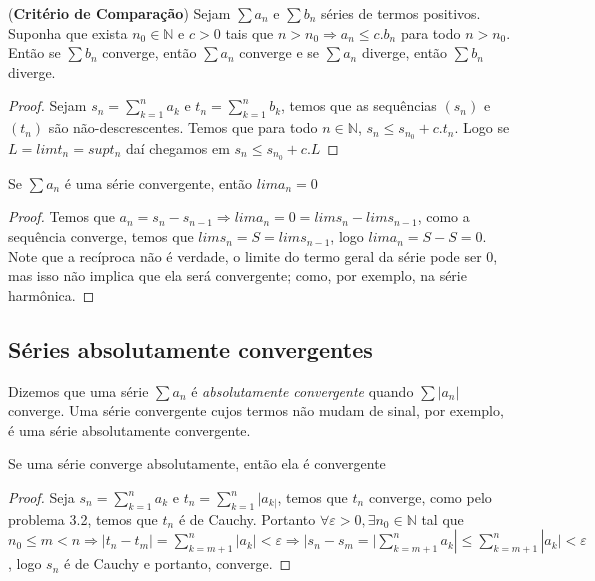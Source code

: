 \begin{theorem}(\textbf{Critério de Comparação})
Sejam $\sum a_{n}$ e $\sum b_{n}$ séries de termos positivos. Suponha que exista $n_{0} \in \mathbb{N}$ e $c>0$ tais que $n>n_{0}\Rightarrow a_{n} \leq c.b_{n}$ para todo $n>n_{0}$. Então se $\sum b_{n}$ converge, então $\sum a_{n}$ converge e se $\sum a_{n}$ diverge, então $\sum b_{n}$ diverge.
\end{theorem}

\begin{proof}
Sejam $s_{n}=\sum_{k=1}^{n}a_{k}$ e $t_{n}=\sum_{k=1}^{n}b_{k}$, temos que as sequências $(s_{n})$ e $(t_{n})$ são não-descrescentes. Temos que para todo $n \in \mathbb{N}$, $s_{n}\leq s_{n_{0}} + c.t_{n}$. Logo se $L=lim t_{n}=sup t_{n}$ daí chegamos em $s_{n}\leq s_{n_{0}} +c.L$
\end{proof}

\begin{theorem}
Se $\sum a_{n}$ é uma série convergente, então $lim a_{n}=0$
\end{theorem}
\begin{proof}
Temos que $a_{n}=s_{n}-s_{n-1}\Rightarrow lim a_{n}=0 = lim s_{n}-lim s_{n-1}$, como a sequência converge, temos que $lim s_{n}=S=lims_{n-1}$, logo $lima_{n}=S-S=0$.
Note que a recíproca não é verdade, o limite do termo geral da série pode ser 0, mas isso não implica que ela será convergente; como, por exemplo, na série harmônica.
\end{proof}
\newpage
\subsection{Séries absolutamente convergentes}
Dizemos que uma série $\sum a_{n}$ é \textit{absolutamente convergente} quando $\sum |a_{n}|$ converge. Uma série convergente cujos termos não mudam de sinal, por exemplo, é uma série absolutamente convergente.

\begin{theorem}
Se uma série converge absolutamente, então ela é convergente
\end{theorem}

\begin{proof}
Seja $s_{n}=\sum_{k=1}^{n}a_{k}$ e $t_{n}=\sum_{k=1}^{n}|a_{k|}$, temos que $t_{n}$ converge, como pelo problema 3.2, temos que $t_{n}$ é de Cauchy. Portanto $\forall \varepsilon>0,\exists n_{0} \in \mathbb{N}$ tal que $n_{0} \leq m < n \Rightarrow |t_{n}-t_{m}|=\sum _{k=m+1}^{n}|a_{k}|<\varepsilon \Rightarrow |s_{n}-s_{m}=|\sum_{k=m+1}^{n}a_{k}| \leq \sum _{k=m+1}^{n}|a_{k}|<\varepsilon$, logo $s_{n}$ é de Cauchy e portanto, converge.
\end{proof}

